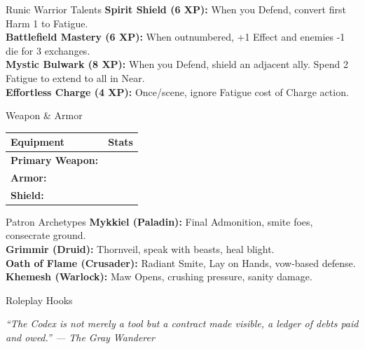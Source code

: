 \documentclass[10pt]{article}
\begin{document}
\begin{minipage}[t]{0.48\linewidth}
    \begin{charbox}{Runic Warrior Talents}
        \textbf{Spirit Shield (6 XP):} When you Defend, convert first Harm 1 to Fatigue.\\
        \textbf{Battlefield Mastery (6 XP):} When outnumbered, +1 Effect and enemies -1 die for 3 exchanges.\\
        \textbf{Mystic Bulwark (8 XP):} When you Defend, shield an adjacent ally. Spend 2 Fatigue to extend to all in Near.\\
        \textbf{Effortless Charge (4 XP):} Once/scene, ignore Fatigue cost of Charge action.
    \end{charbox}
    
    \vspace{0.5em}
    
    \begin{charbox}{Weapon \& Armor}
        \begin{tabular}{>{\bfseries}p{3cm} p{4.5cm}}
            \toprule
            \textbf{Equipment} & \textbf{Stats} \\
            \midrule
            Primary Weapon: & \underline{\hspace{4cm}} \\
            Armor: & \underline{\hspace{4cm}} \\
            Shield: & \underline{\hspace{4cm}} \\
            \bottomrule
        \end{tabular}
    \end{charbox}
    
    \vspace{0.5em}
    
    \begin{charbox}{Patron Archetypes}
        \textbf{Mykkiel (Paladin):} Final Admonition, smite foes, consecrate ground.\\
        \textbf{Grimmir (Druid):} Thornveil, speak with beasts, heal blight.\\
        \textbf{Oath of Flame (Crusader):} Radiant Smite, Lay on Hands, vow-based defense.\\
        \textbf{Khemesh (Warlock):} Maw Opens, crushing pressure, sanity damage.
    \end{charbox}
    
    \vspace{0.5em}
    
    \begin{charbox}{Roleplay Hooks}
        \underline{\hspace{7cm}}\\
        \underline{\hspace{7cm}}
    \end{charbox}
\end{minipage}

\vspace{1em}
\begin{center}
    {\small\sffamily\itshape ``The Codex is not merely a tool but a contract made visible, a ledger of debts paid and owed.'' --- The Gray Wanderer}
\end{center}
\end{document}
